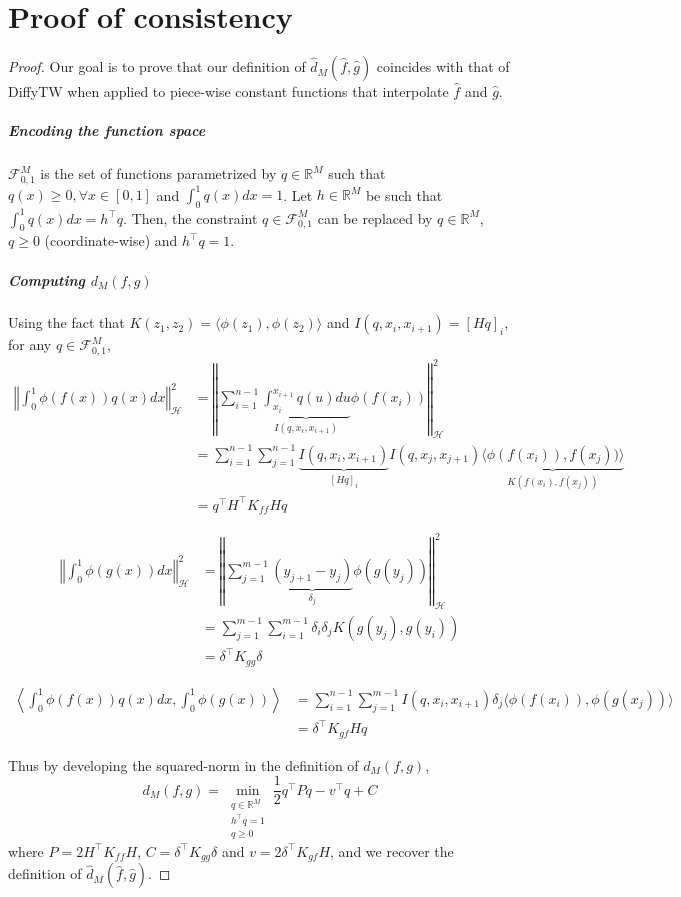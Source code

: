 \section{Proof of consistency}\label{proof:prob-qp}
\begin{proof}
Our goal is to prove that our definition of $\hat d_M(\hat f, \hat g)$ coincides with that of DiffyTW when applied to piece-wise constant functions that interpolate $\hat f$ and $\hat g$.

\subparagraph{Encoding the function space} $\mathcal F_{0, 1}^M$ is the set of functions parametrized by $q\in\mathbb R^M$ such that $q(x) \geq 0, \forall x\in [0,1]$ and $\int_0^1 q(x)dx= 1$. Let $h\in\mathbb R^M$ be such that $\int_0^1q(x)dx = h^\top q$. Then, the constraint $q\in\mathcal F_{0,1}^M$ can be replaced by $q\in\mathbb R^M$, $q\geq 0$ (coordinate-wise) and $h^\top q = 1$.


\subparagraph{Computing $d_M(f, g)$} Using the fact that $K(z_1, z_2) = \langle \phi(z_1), \phi(z_2)\rangle$ and $I(q, x_i, x_{i+1}) = [Hq]_i$, for any $q\in\mathcal F_{0,1}^M$,
\begin{align}
\left \Vert \int_0^1 \phi(f(x))q(x)dx \right\Vert^2_\mathcal H&=\left\Vert\sum_{i=1}^{n-1} \underbrace{\int_{x_i}^{x_{i+1}}q(u)du}_{I(q, x_i, x_{i+1})}\phi(f(x_i))\right\Vert_\mathcal H^2\\
&=\sum_{i=1}^{n-1}\sum_{j=1}^{n-1}\underbrace{I(q, x_i, x_{i+1})}_{[Hq]_i}I(q, x_j, x_{j+1})\underbrace{\langle \phi(f(x_i)), f(x_j))\rangle}_{K(f(x_i), f(x_j))}\\
&= q^\top H^\top K_{ff} H q
\end{align}

\begin{align}
\left\Vert\int_0^1\phi(g(x))dx\right\Vert_\mathcal H^2 &= \left\Vert\sum_{j=1}^{m-1} \underbrace{(y_{j+1} - y_j)}_{\delta_j}\phi(g(y_j))\right\Vert_\mathcal H^2\\
&= \sum_{j=1}^{m-1} \sum_{i=1}^{m-1} \delta_i \delta_j K(g(y_j), g(y_i))\\
& = \delta^\top K_{gg} \delta
\end{align}

\begin{align}
\left\langle \int_0^1\phi(f(x))q(x)dx, \int_0^1\phi(g(x))\right\rangle&=\sum_{i=1}^{n-1}\sum_{j=1}^{m-1} I(q, x_i, x_{i+1}) \delta_j \langle \phi(f(x_i)), \phi(g(x_j))\rangle\\
&= \delta^\top K_{gf} Hq
\end{align}

Thus by developing the squared-norm in the definition of $d_M(f, g)$,
\begin{equation}
d_M(f, g) = \min_{\substack{q\in\mathbb R^M \\ h^\top q = 1 \\ q \geq 0}} \frac{1}{2} q^\top P q - v^\top q + C
\end{equation}
where $P = 2 H^\top K_{ff}H$, $C = \delta^\top K_{gg}\delta$ and $v = 2\delta^\top K_{gf}H$, and we recover the definition of $\hat d_M(\hat f, \hat g)$.
\end{proof}

